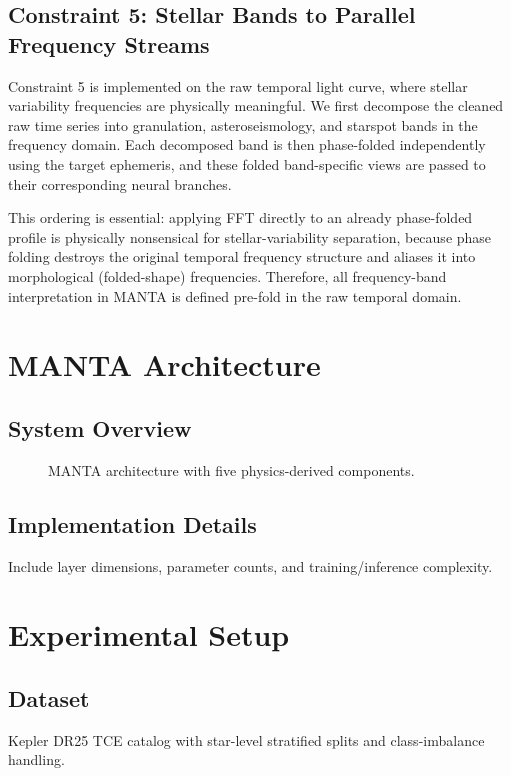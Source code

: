 \documentclass[11pt]{article}
\begin{document}
\subsection{Constraint 5: Stellar Bands to Parallel Frequency Streams}
Constraint 5 is implemented on the raw temporal light curve, where stellar
variability frequencies are physically meaningful. We first decompose the
cleaned raw time series into granulation, asteroseismology, and starspot bands
in the frequency domain. Each decomposed band is then phase-folded
independently using the target ephemeris, and these folded band-specific views
are passed to their corresponding neural branches.

This ordering is essential: applying FFT directly to an already phase-folded
profile is physically nonsensical for stellar-variability separation, because
phase folding destroys the original temporal frequency structure and aliases it
into morphological (folded-shape) frequencies. Therefore, all frequency-band
interpretation in MANTA is defined pre-fold in the raw temporal domain.

\section{MANTA Architecture}
\subsection{System Overview}
\begin{figure}[t]
  \centering
  \caption{MANTA architecture with five physics-derived components.}
  \label{fig:architecture}
\end{figure}

\subsection{Implementation Details}
Include layer dimensions, parameter counts, and training/inference complexity.

\section{Experimental Setup}
\subsection{Dataset}
Kepler DR25 TCE catalog with star-level stratified splits and class-imbalance
handling.
\end{document}
